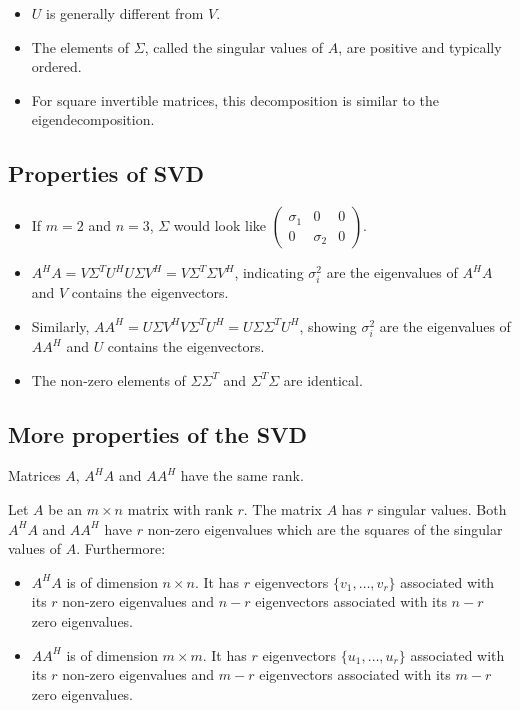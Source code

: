\begin{itemize}
    \item \( U \) is generally different from \( V \).
    \item The elements of \( \Sigma \), called the singular values of \( A \), are positive and typically ordered.
    \item For square invertible matrices, this decomposition is similar to the eigendecomposition.
\end{itemize}

\subsection{Properties of SVD}
\begin{itemize}
    \item If \( m = 2 \) and \( n = 3 \), \( \Sigma \) would look like \( \begin{pmatrix} \sigma_1 & 0 & 0 \\ 0 & \sigma_2 & 0 \end{pmatrix} \).
    \item \( A^H A = V\Sigma^T U^H U\Sigma V^H = V\Sigma^T \Sigma V^H \), indicating \( \sigma_i^2 \) are the eigenvalues of \( A^H A \) and \( V \) contains the eigenvectors.
    \item Similarly, \( AA^H = U\Sigma V^H V\Sigma^T U^H = U\Sigma \Sigma^T U^H \), showing \( \sigma_i^2 \) are the eigenvalues of \( AA^H \) and \( U \) contains the eigenvectors.
    \item The non-zero elements of \( \Sigma \Sigma^T \) and \( \Sigma^T \Sigma \) are identical.
\end{itemize}


\subsection{More properties of the SVD}

Matrices \( A \), \( A^H A \) and \( AA^H \) have the same rank.

Let \( A \) be an \( m \times n \) matrix with rank \( r \). The matrix \( A \) has \( r \) singular values. Both \( A^H A \) and \( AA^H \) have \( r \) non-zero eigenvalues which are the squares of the singular values of \( A \). Furthermore:
\begin{itemize}
    \item \( A^H A \) is of dimension \( n \times n \). It has \( r \) eigenvectors \( \{v_1, \ldots, v_r\} \) associated with its \( r \) non-zero eigenvalues and \( n - r \) eigenvectors associated with its \( n - r \) zero eigenvalues.
    \item \( AA^H \) is of dimension \( m \times m \). It has \( r \) eigenvectors \( \{u_1, \ldots, u_r\} \) associated with its \( r \) non-zero eigenvalues and \( m - r \) eigenvectors associated with its \( m - r \) zero eigenvalues.
\end{itemize}

